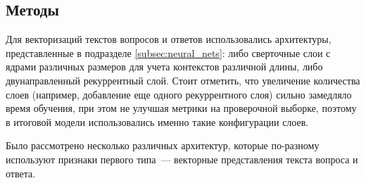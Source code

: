 \documentclass[../diploma.tex]{subfiles}
\begin{document}
	\subsection{Методы}

	\label{sec:methods}

	Для векторизаций текстов вопросов и ответов использовались архитектуры, представленные в подразделе \ref{subsec:neural_nets}: 
	либо сверточные слои с ядрами различных размеров для учета контекстов различной длины, либо двунаправленный рекуррентный слой.
	Стоит отметить, что увеличение количества слоев (например, добавление еще одного рекуррентного слоя) сильно замедляло время обучения, 
	при этом не улучшая метрики на проверочной выборке, поэтому в итоговой модели использовались именно такие конфигурации слоев.

	Было рассмотрено несколько различных архитектур, которые по-разному используют признаки первого типа~--- векторные представления текста вопроса и ответа.
\end{document}
